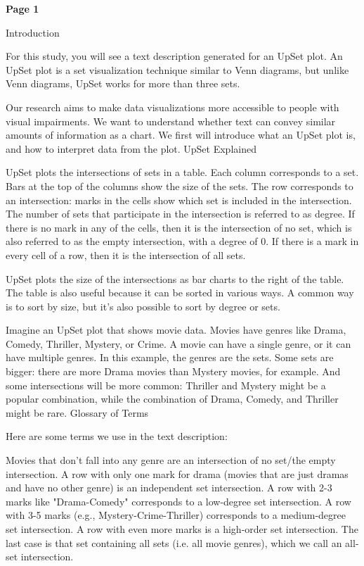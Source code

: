 \documentclass{egpubl}
\begin{document}
\textbf{Page 1}

Introduction

For this study, you will see a text description generated for an UpSet plot. An UpSet plot is a set visualization technique similar to Venn diagrams, but unlike Venn diagrams, UpSet works for more than three sets.

Our research aims to make data visualizations more accessible to people with visual impairments. We want to understand whether text can convey similar amounts of information as a chart. We first will introduce what an UpSet plot is, and how to interpret data from the plot.
UpSet Explained

UpSet plots the intersections of sets in a table. Each column corresponds to a set. Bars at the top of the columns show the size of the sets. The row corresponds to an intersection: marks in the cells show which set is included in the intersection. The number of sets that participate in the intersection is referred to as degree. If there is no mark in any of the cells, then it is the intersection of no set, which is also referred to as the empty intersection, with a degree of 0. If there is a mark in every cell of a row, then it is the intersection of all sets.

UpSet plots the size of the intersections as bar charts to the right of the table. The table is also useful because it can be sorted in various ways. A common way is to sort by size, but it's also possible to sort by degree or sets.

Imagine an UpSet plot that shows movie data. Movies have genres like Drama, Comedy, Thriller, Mystery, or Crime. A movie can have a single genre, or it can have multiple genres. In this example, the genres are the sets. Some sets are bigger: there are more Drama movies than Mystery movies, for example. And some intersections will be more common: Thriller and Mystery might be a popular combination, while the combination of Drama, Comedy, and Thriller might be rare.
Glossary of Terms

Here are some terms we use in the text description:

Movies that don’t fall into any genre are an intersection of no set/the empty intersection.
A row with only one mark for drama (movies that are just dramas and have no other genre) is an independent set intersection.
A row with 2-3 marks like "Drama-Comedy" corresponds to a low-degree set intersection.
A row with 3-5 marks (e.g., Mystery-Crime-Thriller) corresponds to a medium-degree set intersection. A row with even more marks is a high-order set intersection.
The last case is that set containing all sets (i.e. all movie genres), which we call an all-set intersection.
\end{document}
